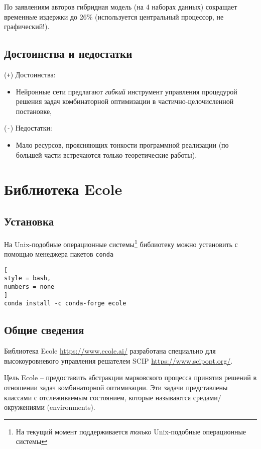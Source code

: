 \documentclass[%
	11pt,
	a4paper,
	utf8,
		]{article}
\begin{document}
По заявлениям авторов гибридная модель (на 4 наборах данных) сокращает временн\emph{ы}е издержки до 26\% (используется центральный процессор, не графический!).

\subsection{Достоинства и недостатки}

(\texttt{+}) Достоинства:
\begin{itemize}
	\item Нейронные сети предлагают \emph{гибкий} инструмент управления процедурой решения задач комбинаторной оптимизации в частично-целочисленной постановке,
\end{itemize}

(\texttt{-}) Недостатки:
\begin{itemize}
	\item Мало ресурсов, проясняющих тонкости программной реализации (по большей части встречаются только теоретические работы).
\end{itemize}


\section{Библиотека Ecole}

\subsection{Установка}

На Unix-подобные операционные системы\footnote{На текущий момент поддерживается \emph{только} Unix-подобные операционные системы} библиотеку можно установить с помощью менеджера пакетов \texttt{conda}
\begin{lstlisting}[
style = bash,
numbers = none
]
conda install -c conda-forge ecole
\end{lstlisting}

\subsection{Общие сведения}

Библиотека Ecole \url{https://www.ecole.ai/} разработана специально для высокоуровневого управления решателем SCIP \url{https://www.scipopt.org/}.

Цель Ecole -- предоставить абстракции марковского процесса принятия решений в отношении задач комбинаторной оптимизации. Эти задачи представлены классами с отслеживаемым состоянием, которые называются средами/окружениями (environments).
\end{document}
